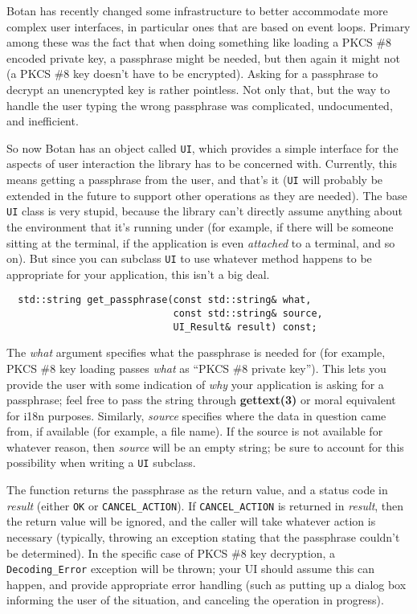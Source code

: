 \documentclass{article}
\newcommand{\function}[1]{\textbf{#1}}
\newcommand{\type}[1]{\texttt{#1}}
\renewcommand{\arg}[1]{\textsl{#1}}
\begin{document}
Botan has recently changed some infrastructure to better accommodate
more complex user interfaces, in particular ones that are based on
event loops. Primary among these was the fact that when doing
something like loading a PKCS \#8 encoded private key, a passphrase
might be needed, but then again it might not (a PKCS \#8 key doesn't
have to be encrypted). Asking for a passphrase to decrypt an
unencrypted key is rather pointless. Not only that, but the way to
handle the user typing the wrong passphrase was complicated,
undocumented, and inefficient.

So now Botan has an object called \type{UI}, which provides a simple
interface for the aspects of user interaction the library has to be
concerned with. Currently, this means getting a passphrase from the
user, and that's it (\type{UI} will probably be extended in the future
to support other operations as they are needed). The base \type{UI}
class is very stupid, because the library can't directly assume
anything about the environment that it's running under (for example,
if there will be someone sitting at the terminal, if the application
is even \emph{attached} to a terminal, and so on). But since you can
subclass \type{UI} to use whatever method happens to be appropriate
for your application, this isn't a big deal.

\begin{verbatim}
  std::string get_passphrase(const std::string& what,
                             const std::string& source,
                             UI_Result& result) const;
\end{verbatim}

The \arg{what} argument specifies what the passphrase is needed for (for
example, PKCS \#8 key loading passes \arg{what} as ``PKCS \#8 private
key''). This lets you provide the user with some indication of \emph{why} your
application is asking for a passphrase; feel free to pass the string through
\function{gettext(3)} or moral equivalent for i18n purposes. Similarly,
\arg{source} specifies where the data in question came from, if available (for
example, a file name). If the source is not available for whatever reason, then
\arg{source} will be an empty string; be sure to account for this possibility
when writing a \type{UI} subclass.

The function returns the passphrase as the return value, and a status code in
\arg{result} (either \type{OK} or \type{CANCEL\_ACTION}). If
\type{CANCEL\_ACTION} is returned in \arg{result}, then the return value will
be ignored, and the caller will take whatever action is necessary (typically,
throwing an exception stating that the passphrase couldn't be determined). In
the specific case of PKCS \#8 key decryption, a \type{Decoding\_Error}
exception will be thrown; your UI should assume this can happen, and provide
appropriate error handling (such as putting up a dialog box informing the user
of the situation, and canceling the operation in progress).
\end{document}
